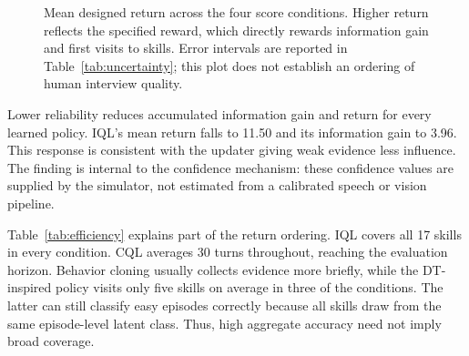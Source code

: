 \documentclass[10pt,a4paper]{article}
\begin{document}
\begin{figure}[htbp]
\centering
{}
\caption{Mean designed return across the four score conditions. Higher return reflects the specified reward, which directly rewards information gain and first visits to skills. Error intervals are reported in Table~\ref{tab:uncertainty}; this plot does not establish an ordering of human interview quality.}
\label{fig:returns}
\end{figure}

Lower reliability reduces accumulated information gain and return for every learned policy. IQL's mean return falls to 11.50 and its information gain to 3.96. This response is consistent with the updater giving weak evidence less influence. The finding is internal to the confidence mechanism: these confidence values are supplied by the simulator, not estimated from a calibrated speech or vision pipeline.

Table~\ref{tab:efficiency} explains part of the return ordering. IQL covers all 17 skills in every condition. CQL averages 30 turns throughout, reaching the evaluation horizon. Behavior cloning usually collects evidence more briefly, while the DT-inspired policy visits only five skills on average in three of the conditions. The latter can still classify easy episodes correctly because all skills draw from the same episode-level latent class. Thus, high aggregate accuracy need not imply broad coverage.
\end{document}
